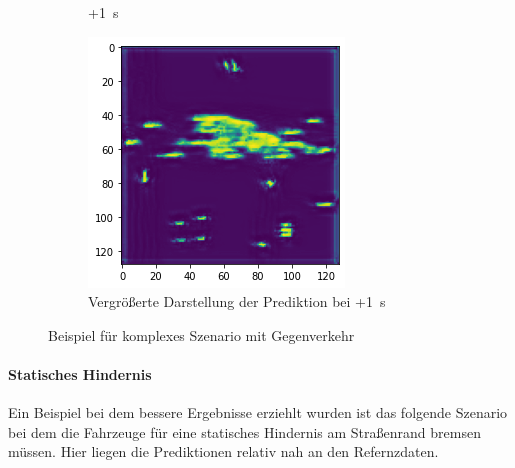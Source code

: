 \documentclass[12pt]{article}
\begin{document}
\begin{figure}[H]
\begin{subfigure}[b]{0.18\textwidth}
            \caption{+1~s}
        \end{subfigure}
        \vspace{1cm}
        \begin{subfigure}[b]{0.6\textwidth}
            \includegraphics[width=\textwidth]{output_opposite_4.png}
            \caption{Vergrößerte Darstellung der Prediktion bei +1~s}
        \end{subfigure}
        \caption{Beispiel für komplexes Szenario mit Gegenverkehr}\label{fig:out_opposite}
    \end{figure}

    \pagebreak
    \paragraph{Statisches Hindernis} Ein Beispiel bei dem bessere Ergebnisse erziehlt wurden ist das folgende Szenario bei dem die Fahrzeuge für eine statisches Hindernis am Straßenrand bremsen müssen. 
    Hier liegen die Prediktionen relativ nah an den Refernzdaten.
\end{document}
